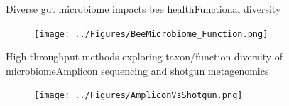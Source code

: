 \documentclass{beamer}
\begin{document}
\begin{frame}{Diverse gut microbiome impacts bee health}{Functional diversity}
    \begin{figure}
        \texttt{[image: ../Figures/BeeMicrobiome\_Function.png]}
    \end{figure}
\end{frame}

\begin{frame}{High-throughput methods exploring taxon/function diversity of microbiome}{Amplicon sequencing and shotgun metagenomics}
    \begin{figure}
        \texttt{[image: ../Figures/AmpliconVsShotgun.png]}
    \end{figure} 
\end{frame}
\end{document}
